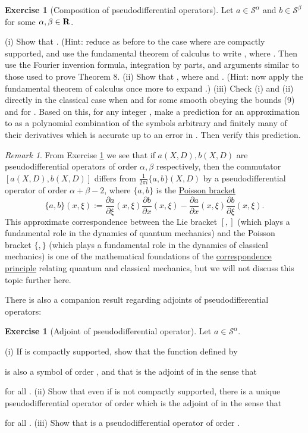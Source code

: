 \documentclass[11pt]{article}
\theoremstyle{definition}
\newtheorem{exercise}[theorem]{Exercise}
\theoremstyle{remark}
\newtheorem{remark}[theorem]{Remark}
\begin{document}
\begin{exercise}[Composition of pseudodifferential operators]
 \label{comp-p} Let \({a \in {\mathcal S}^\alpha}\) and \({b \in {\mathcal S}^\beta}\) for some \({\alpha,\beta \in {\bf R}}\). 

(i) Show that . (Hint: reduce as before to the case where  are compactly supported, and use the fundamental theorem of calculus to write , where . Then use the Fourier inversion formula, integration by parts, and arguments similar to those used to prove Theorem 8. 
(ii) Show that , where  and . (Hint: now apply the fundamental theorem of calculus once more to expand .) 
(iii) Check (i) and (ii) directly in the classical case when  and  for some smooth  obeying the bounds (9) and for . Based on this, for any integer , make a prediction for an approximation to  as a polynomial combination of the symbols arbitrary  and finitely many of their derivatives which is accurate up to an error in . Then verify this prediction.



\end{exercise}
\begin{remark}
 \label{ph} From Exercise \ref{comp-p} we see that if \({a(X,D), b(X,D)}\) are pseudodifferential operators of order \({\alpha,\beta}\) respectively, then the commutator \({[a(X,D),b(X,D)]}\) differs from \({\frac{1}{2\pi i} \{a,b\}(X,D)}\) by a pseudodifferential operator of order \({\alpha+\beta-2}\), where \({\{a,b\}}\) is the \href{https://en.wikipedia.org/wiki/Poisson_bracket}{Poisson bracket} 
\[\displaystyle  \{a,b\}(x,\xi) := \frac{\partial a}{\partial \xi}(x,\xi) \frac{\partial b}{\partial x}(x,\xi) - \frac{\partial a}{\partial x}(x,\xi) \frac{\partial b}{\partial \xi}(x,\xi).\]
 This approximate correspondence between the Lie bracket \({[,]}\) (which plays a fundamental role in the dynamics of quantum mechanics) and the Poisson bracket \({\{,\}}\) (which plays a fundamental role in the dynamics of classical mechanics) is one of the mathematical foundations of the \href{https://en.wikipedia.org/wiki/Correspondence_principle}{correspondence principle} relating quantum and classical mechanics, but we will not discuss this topic further here. 
\end{remark}

There is also a companion result regarding adjoints of pseudodifferential operators:

\begin{exercise}[Adjoint of pseudodifferential operator]
 \label{adj-p} Let \({a \in {\mathcal S}^\alpha}\). 

(i) If  is compactly supported, show that the function  defined by

 is also a symbol of order , and that  is the adjoint of  in the sense that 

 for all . 
(ii) Show that even if  is not compactly supported, there is a unique pseudodifferential operator  of order  which is the adjoint of  in the sense that

 for all . 
(iii) Show that  is a pseudodifferential operator of order .



\end{exercise}
\end{document}
